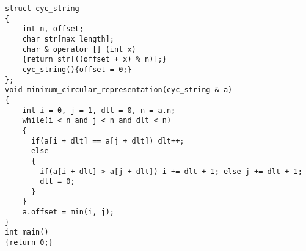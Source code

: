 \begin{lstlisting}
struct cyc_string
{
	int n, offset;
	char str[max_length];
	char & operator [] (int x)
	{return str[((offset + x) % n)];}
	cyc_string(){offset = 0;}
};
void minimum_circular_representation(cyc_string & a)
{
	int i = 0, j = 1, dlt = 0, n = a.n;
	while(i < n and j < n and dlt < n)
	{
	  if(a[i + dlt] == a[j + dlt]) dlt++;
	  else
	  {
	    if(a[i + dlt] > a[j + dlt]) i += dlt + 1; else j += dlt + 1;
	    dlt = 0;
	  }
	}
	a.offset = min(i, j);
}
int main()
{return 0;}
\end{lstlisting}
